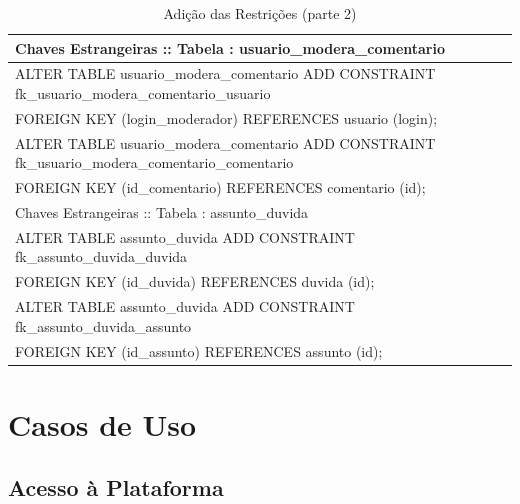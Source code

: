 \documentclass[graduacao,brazil]{ThesisPUC}
\begin{document}
\begin{table}[H]
{\begin{tabular}{|l|}
    Chaves Estrangeiras :: Tabela : usuario\_modera\_comentario                                                                                                                                                                                                                                                               \\ \hline
    ALTER TABLE usuario\_modera\_comentario ADD CONSTRAINT fk\_usuario\_modera\_comentario\_usuario \\FOREIGN KEY (login\_moderador) REFERENCES usuario (login);\\ALTER TABLE usuario\_modera\_comentario ADD CONSTRAINT fk\_usuario\_modera\_comentario\_comentario \\FOREIGN KEY (id\_comentario) REFERENCES comentario (id);   \\ \hline
    Chaves Estrangeiras :: Tabela : assunto\_duvida                                                                                                                                                                                                                                                                           \\ \hline
    ALTER TABLE assunto\_duvida ADD CONSTRAINT fk\_assunto\_duvida\_duvida \\FOREIGN KEY (id\_duvida) REFERENCES duvida (id);\\ALTER TABLE assunto\_duvida ADD CONSTRAINT fk\_assunto\_duvida\_assunto \\FOREIGN KEY (id\_assunto) REFERENCES assunto (id);                                                                       \\ \hline
    \end{tabular}
    }
    \caption {Adi\c{c}\~{a}o das Restri\c{c}\~{o}es (parte 2)}
\end{table}


\section{Casos de Uso}

\subsection{Acesso \`{a} Plataforma}
\end{document}
